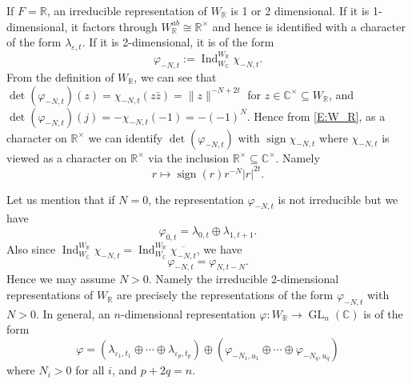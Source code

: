 \documentclass[11pt]{amsart}
\theoremstyle{plain}
\theoremstyle{definition}
\numberwithin{equation}{section}
\newcommand{\C}{\mathbb C}
\newcommand{\R}{\mathbb{R}}
\newcommand{\la}{\lambda}
\newcommand{\ep}{\varepsilon}
\newcommand{\Ind}{\operatorname{Ind}}
\newcommand{\sign}{\operatorname{sign}}
\newcommand{\GL}{\operatorname{GL}}
\begin{document}
If $F=\R$, an irreducible representation of $W_\R$ is 1 or 2 dimensional. If it
is 1-dimensional, it factors through $W_\R^{ab}\cong\R^\times$ and
hence is identified with a character of the form $\la_{\ep, t}$. If it
is 2-dimensional, it is of the form
\[
\varphi_{-N,t}:=\Ind_{W_\C}^{W_\R}\chi_{-N,t}.
\]
From the definition of $W_\R$, we can see that
$\det(\varphi_{-N,t})(z)=\chi_{-N, t}(z\bar{z})=\|z\|^{-N+2t}$ for
$z\in\C^\times\subseteq W_\R$, and
$\det(\varphi_{-N,t})(j)=-\chi_{-N,t}(-1)=-(-1)^N$. Hence from
\eqref{E:W_R}, as a character on $\R^\times$ we can identify $\det(\varphi_{-N,t})$ with
$\sign\chi_{-N, t}$ where $\chi_{-N, t}$ is viewed as a character on $\R^\times$ via the
inclusion $\R^\times\subseteq\C^\times$. Namely
\begin{equation}\label{E:central_character}
r\mapsto\sign(r) r^{-N}|r|^{2t}.
\end{equation}

Let us mention that if $N=0$, the representation $\varphi_{-N,t}$ is not irreducible but
we have
\[
\varphi_{0, t}=\la_{0, t}\oplus\la_{1, t+1}.
\]
Also since
$\Ind_{W_\C}^{W_\R}\chi_{-N,t}=\Ind_{W_\C}^{W_\R}\overline{\chi_{-N,t}}$,
we have 
\begin{equation}\label{E:N>0}
\varphi_{-N,t}=\varphi_{N, t-N}.
\end{equation}
Hence we may assume
$N>0$. Namely the irreducible 2-dimensional representations of $W_\R$
are precisely the representations of the form $\varphi_{-N,t}$ with
$N>0$. In
general, an $n$-dimensional representation
$\varphi:W_\R\rightarrow\GL_n(\C)$ is of the form
\begin{equation}\label{E:general_parameter_R}
\varphi=\left(\la_{\ep_1,t_1}\oplus\cdots\oplus\la_{\ep_p,t_p}\right)\oplus
\left(\varphi_{-N_1,u_1}\oplus\cdots\oplus\varphi_{-N_q, u_q}\right)
\end{equation}
where $N_i>0$ for all $i$, and $p+2q=n$.
\end{document}
